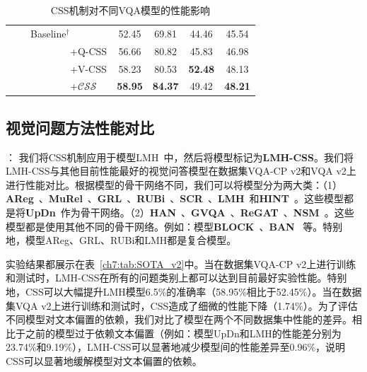 \begin{table}[tbp]
\begin{center}
{\begin{tabular}{|l | l | l | c c c c|}
                & & Baseline$^\dagger$ & 52.45 & 69.81 & 44.46 & 45.54 \\
                & & ~~~~~~~~+Q-CSS & 56.66 & 80.82 & 45.83 & 46.98 \\
                & & ~~~~~~~~+V-CSS & 58.23 & 80.53 & \textbf{52.48} & 48.13 \\
                & & ~~~~~~~~+$\mathcal{CSS}$ & \textbf{58.95} & \textbf{84.37} & 49.42 & \textbf{48.21} \\
                \hline
            \end{tabular}
        } %
    \end{center}
    \caption{CSS机制对不同VQA模型的性能影响}
    \label{ch7:tab:boost_models}
\end{table}

\subsection{视觉问题方法性能对比}

\textbf{}：
我们将CSS机制应用于模型LMH~\cite{clark2019don}中，然后将模型标记为\textbf{LMH-CSS}。我们将LMH-CSS与其他目前性能最好的视觉问答模型在数据集VQA-CP v2和VQA v2上进行性能对比。根据模型的骨干网络不同，我们可以将模型分为两大类：（1）\textbf{AReg}~\cite{ramakrishnan2018overcoming}、\textbf{MuRel}~\cite{cadene2019murel}、\textbf{GRL}~\cite{grand2019adversarial}、\textbf{RUBi}~\cite{cadene2019rubi}、\textbf{SCR}~\cite{wu2019self}、\textbf{LMH}~\cite{clark2019don}和\textbf{HINT}~\cite{selvaraju2019taking}。这些模型都是将\textbf{UpDn}~\cite{anderson2018bottom}作为骨干网络。（2）\textbf{HAN}~\cite{malinowski2018learning}、\textbf{GVQA}~\cite{agrawal2018don}、\textbf{ReGAT}~\cite{li2019relation}、\textbf{NSM}~\cite{hudson2019learning}。这些模型都是使用其他不同的骨干网络。例如：模型\textbf{BLOCK}~\cite{ben2019block}、\textbf{BAN}~\cite{kim2018bilinear} 等。特别地，模型AReg、GRL、RUBi和LMH都是复合模型。

实验结果都展示在表~\ref{ch7:tab:SOTA_v2}中。当在数据集VQA-CP v2上进行训练和测试时，LMH-CSS在所有的问题类别上都可以达到目前最好实验性能。特别地，CSS可以大幅提升LMH模型6.5\%的准确率（58.95\%相比于52.45\%）。当在数据集VQA v2上进行训练和测试时，CSS造成了细微的性能下降（1.74\%）。为了评估不同模型对文本偏置的依赖，我们对比了模型在两个不同数据集中性能的差异。相比于之前的模型过于依赖文本偏置（例如：模型UpDn和LMH的性能差分别为23.74\%和9.19\%），LMH-CSS可以显著地减少模型间的性能差异至0.96\%，说明CSS可以显著地缓解模型对文本偏置的依赖。


